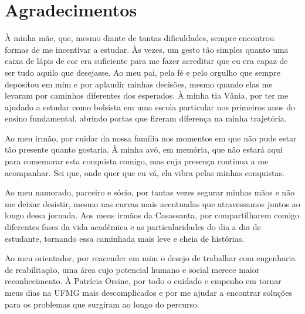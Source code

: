 \chapter*{Agradecimentos}

À minha mãe, que, mesmo diante de tantas dificuldades, sempre encontrou formas de me incentivar a estudar. Às vezes, um gesto tão simples quanto uma caixa de lápis de cor era suficiente para me fazer acreditar que eu era capaz de ser tudo aquilo que desejasse. Ao meu pai, pela fé e pelo orgulho que sempre depositou em mim e por aplaudir minhas decisões, mesmo quando elas me levaram por caminhos diferentes dos esperados. À minha tia Vânia, por ter me ajudado a estudar como bolsista em uma escola particular nos primeiros anos do ensino fundamental, abrindo portas que fizeram diferença na minha trajetória.

Ao meu irmão, por cuidar da nossa família nos momentos em que não pude estar tão presente quanto gostaria. À minha avó, em memória, que não estará aqui para comemorar esta conquista comigo, mas cuja presença continua a me acompanhar. Sei que, onde quer que eu vá, ela vibra pelas minhas conquistas.

Ao meu namorado, parceiro e sócio, por tantas vezes segurar minhas mãos e não me deixar desistir, mesmo nas curvas mais acentuadas que atravessamos juntos ao longo dessa jornada. Aos meus irmãos da Casassanta, por compartilharem comigo diferentes fases da vida acadêmica e as particularidades do dia a dia de estudante, tornando essa caminhada mais leve e cheia de histórias.

Ao meu orientador, por reacender em mim o desejo de trabalhar com engenharia de reabilitação, uma área cujo potencial humano e social merece maior reconhecimento. À Patrícia Orsine, por todo o cuidado e empenho em tornar meus dias na UFMG mais descomplicados e por me ajudar a encontrar soluções para os problemas que surgiram ao longo do percurso.

\clearpage

